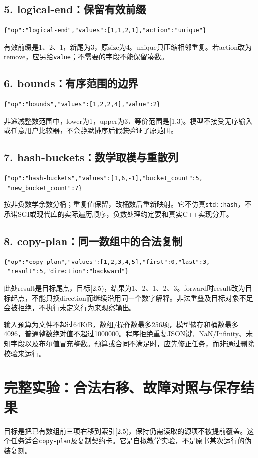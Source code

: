 \documentclass[11pt,a4paper,fontset=fandol]{ctexart}
\begin{document}
\subsection{5. logical-end：保留有效前缀}
\begin{lstlisting}
{"op":"logical-end","values":[1,1,2,1],"action":"unique"}
\end{lstlisting}
有效前缀是1、2、1，新尾为3，原size为4。unique只压缩相邻重复。若action改为remove，应另给\texttt{value}；不需要的字段不能保留凑数。

\subsection{6. bounds：有序范围的边界}
\begin{lstlisting}
{"op":"bounds","values":[1,2,2,4],"value":2}
\end{lstlisting}
非递减整数范围中，lower为1，upper为3，等价范围是[1,3)。模型不接受无序输入或任意用户比较器，不会静默排序后假装验证了原范围。

\subsection{7. hash-buckets：数学取模与重散列}
\begin{lstlisting}
{"op":"hash-buckets","values":[1,6,-1],"bucket_count":5,
 "new_bucket_count":7}
\end{lstlisting}
按非负数学余数分桶；重复值保留，改桶数后重新映射。它不仿真\texttt{std::hash}，不承诺SGI或现代库的实际遍历顺序，负数处理约定要和真实C++实现分开。

\subsection{8. copy-plan：同一数组中的合法复制}
\begin{lstlisting}
{"op":"copy-plan","values":[1,2,3,4,5],"first":0,"last":3,
 "result":5,"direction":"backward"}
\end{lstlisting}
此处result是目标尾点，目标[2,5)，结果为1、2、1、2、3。forward时result改为目标起点，不能只换direction而继续沿用同一个数字解释。非法重叠及目标对象不足会被拒绝，不执行未定义行为来观察输出。

输入预算为文件不超过64KiB，数组/操作数最多256项，模型储存和桶数最多4096，普通整数绝对值不超过1000000。程序拒绝重复JSON键、NaN/Infinity、未知字段以及布尔值冒充整数。预算或合同不满足时，应先修正任务，而非通过删除校验来运行。
\section{完整实验：合法右移、故障对照与保存结果}
目标是把已有数组前三项右移到索引[2,5)，保持仍需读取的源项不被提前覆盖。这个任务适合\texttt{copy-plan}及复制契约卡。它是自拟教学实验，不是原书某次运行的伪装复刻。
\end{document}
